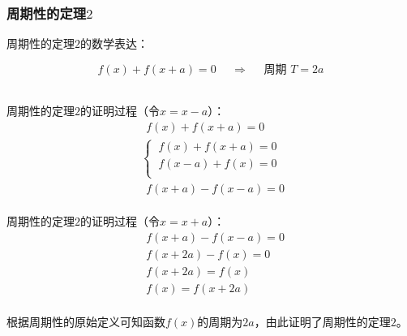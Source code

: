 \documentclass[UTF8]{ctexart}
\begin{document}
\subsubsection{周期性的定理$2$}
    \setcounter{equation}{0}
    周期性的定理$2$的数学表达：
    \begin{large}
        \begin{equation*}
            f(x)+f(x+a)=0~~~~~~\Longrightarrow~~~~~~\text{周期~}T=2a
        \end{equation*}
    \end{large}\\
    周期性的定理$2$的证明过程（令$x=x-a$）：
    \begin{align}
        &~~f(x)+f(x+a)=0~~\\[3mm]
        &\begin{cases}
            ~f(x)+f(x+a)=0\\[1mm]
            ~f(x-a)+f(x)=0\\[1mm]
        \end{cases}\\[3mm]
        &~~f(x+a)-f(x-a)=0~~
    \end{align}\\
    周期性的定理$2$的证明过程（令$x=x+a$）：
    \begin{align}
        &f(x+a)-f(x-a)=0\\[3mm]
        &f(x+2a)-f(x)=0\\[3mm]
        &f(x+2a)=f(x)\\[3mm]
        &f(x)=f(x+2a)
    \end{align}\\
    根据周期性的原始定义可知函数$f(x)$的周期为$2a$，由此证明了周期性的定理$2$。\vspace{5pt}

\newpage
\end{document}
